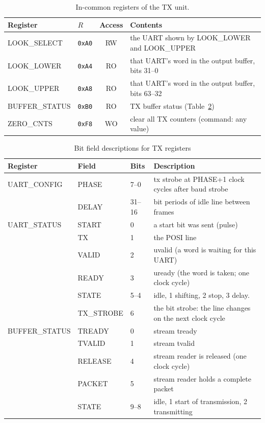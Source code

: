 \documentclass[12pt]{article}
\newcommand{\hex}[1]{\texttt{0x#1}}
\begin{document}
\begin{table}
\caption{\label{tbl:tx-common} In-common registers of the TX unit.}
\begin{center}
\begin{tabular}{llc>{\raggedright\arraybackslash}p{10.5cm}}
Register        & $R$      & Access & Contents \\
\hline
LOOK\_SELECT    & \hex{A0} & RW & the UART shown by LOOK\_LOWER and LOOK\_UPPER \\
LOOK\_LOWER     & \hex{A4} & RO & that UART's word in the output buffer, bits 31--0 \\
LOOK\_UPPER     & \hex{A8} & RO & that UART's word in the output buffer, bits 63--32 \\
BUFFER\_STATUS  & \hex{B0} & RO & TX buffer status (Table~\ref{tbl:tx-bit-fields}) \\
ZERO\_CNTS      & \hex{F8} & WO & clear all TX counters (command: any value) \\
\end{tabular}
\end{center}
\end{table}

\begin{table}
\caption{Bit field descriptions for TX registers}
\label{tbl:tx-bit-fields}
\begin{center}
\begin{tabular}{lll>{\raggedright\arraybackslash}p{9.0cm}}
Register       & Field   & Bits   & Description \\
\hline
UART\_CONFIG   & PHASE   & 7--0   & tx strobe at PHASE+1 clock cycles after baud strobe\\
               & DELAY   & 31--16 & bit periods of idle line between frames \\
\hline
UART\_STATUS   & START      & 0    & a start bit was sent (pulse) \\
               & TX         & 1    & the POSI line \\
               & VALID      & 2    & uvalid (a word is waiting for this UART) \\
               & READY      & 3    & uready (the word is taken; one clock cycle) \\
               & STATE      & 5--4 & 0 idle, 1 shifting, 2 stop, 3 delay.  \\
               & TX\_STROBE & 6    & the bit strobe:  the line changes on the next clock cycle \\
\hline
BUFFER\_STATUS & TREADY  & 0      & stream tready \\
               & TVALID  & 1      & stream tvalid \\
               & RELEASE & 4      & stream reader is released (one clock cycle) \\
               & PACKET  & 5      & stream reader holds a complete packet \\
               & STATE   & 9--8   & 0 idle, 1 start of transmission, 2 transmitting \\
\end{tabular}
\end{center}
\end{table}
\end{document}
